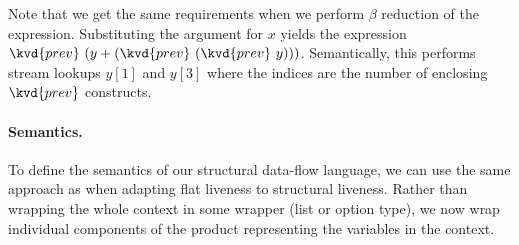 Note that we get the same requirements when we perform $\beta$ reduction of the expression. 
Substituting the argument for $x$ yields the expression $\kvd{prev}~(y+(\kvd{prev}~(\kvd{prev}~y)))$. 
Semantically, this performs stream lookups $y[1]$ and $y[3]$ where the indices are the 
number of enclosing $\kvd{prev}$ constructs.

\paragraph{Semantics.}
To define the semantics of our structural data-flow language, we can use the same approach as when
adapting flat liveness to structural liveness. Rather than wrapping the whole context in some wrapper
(list or option type), we now wrap individual components of the product representing the variables
in the context. 

